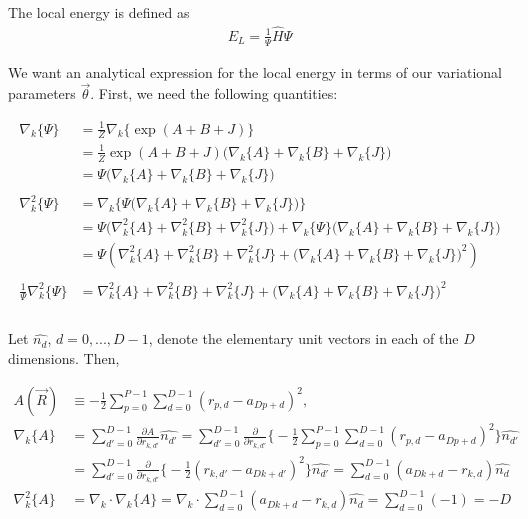\documentclass[12pt]{article}
\begin{document}
\noindent The local energy is defined as
\begin{align*}
E_L = \frac{1}{\Psi} \hat{H} \Psi
\end{align*}

\noindent We want an analytical expression for the local energy in terms of our variational parameters $\vec{\theta}$. First, we need the following quantities:

\begin{align*}
\nabla_k \{ \Psi \} &= \frac{1}{Z} \nabla_k \Big\{ \exp(A+B+J) \Big\} \\
&= \frac{1}{Z} \exp(A+B+J) \Big( \nabla_k \{ A \} + \nabla_k \{ B \} +\nabla_k \{ J \} \Big)\\
& = \Psi \Big( \nabla_k \{ A \} + \nabla_k \{ B \} +\nabla_k \{ J \} \Big) \\ \\
\nabla_k^2 \{\Psi \} &= \nabla_k \Big\{ \Psi \Big( \nabla_k \{ A \} + \nabla_k \{ B \} +\nabla_k \{ J \} \Big) \Big\}\\
&= \Psi \Big( \nabla_k^2 \{ A \} + \nabla_k^2 \{ B \} +\nabla_k^2 \{ J \} \Big) + \nabla_k \{ \Psi \} \Big( \nabla_k \{ A \} + \nabla_k \{ B \} +\nabla_k \{ J \} \Big)\\
&= \Psi \left(  \nabla_k^2 \{ A \} + \nabla_k^2 \{ B \} +\nabla_k^2 \{ J \}  + \Big( \nabla_k \{ A \} + \nabla_k \{ B \} +\nabla_k \{ J \} \Big)^2 \right)\\ \\ 
\frac{1}{\Psi} \nabla_k^2 \{ \Psi \} &= \nabla_k^2 \{ A \} + \nabla_k^2 \{ B \} +\nabla_k^2 \{ J \}  + \Big( \nabla_k \{ A \} + \nabla_k \{ B \} +\nabla_k \{ J \} \Big)^2\\ \\
\end{align*}

\noindent Let $\hat{n_d}$, $d = 0, ..., D-1$, denote the elementary unit vectors in each of the $D$ dimensions. Then,

\begin{align*}
A(\vec{R}) &\equiv -\frac{1}{2} \sum_{p=0}^{P-1}\sum_{d=0}^{D-1} (r_{p,d} - a_{Dp+d})^2,\\
\nabla_k \{A\}
&= \sum_{d'=0}^{D-1} \frac{\partial A}{\partial r_{k,d'}} \hat{n_{d'}} = \sum_{d'=0}^{D-1} \frac{\partial}{\partial r_{k,d'}} \bigg\{ -\frac{1}{2} \sum_{p=0}^{P-1}\sum_{d=0}^{D-1} (r_{p,d} - a_{Dp+d})^2 \bigg\} \hat{n_{d'}} \\
&= \sum_{d'=0}^{D-1} \frac{\partial}{\partial r_{k,d'}} \bigg\{ -\frac{1}{2}  (r_{k,d'} - a_{Dk+d'})^2 \bigg\} \hat{n_{d'}} = \sum_{d=0}^{D-1} (a_{Dk+d} -r_{k,d} ) \hat{n_{d}}  \\
\nabla_k^2 \{A\} &= \nabla_k \cdot \nabla_k\{A\} = \nabla_k \cdot \sum_{d=0}^{D-1} (a_{Dk+d} -r_{k,d} ) \hat{n_{d}} = \sum_{d=0}^{D-1} (-1) = -D\\ 
\end{align*}
\end{document}
